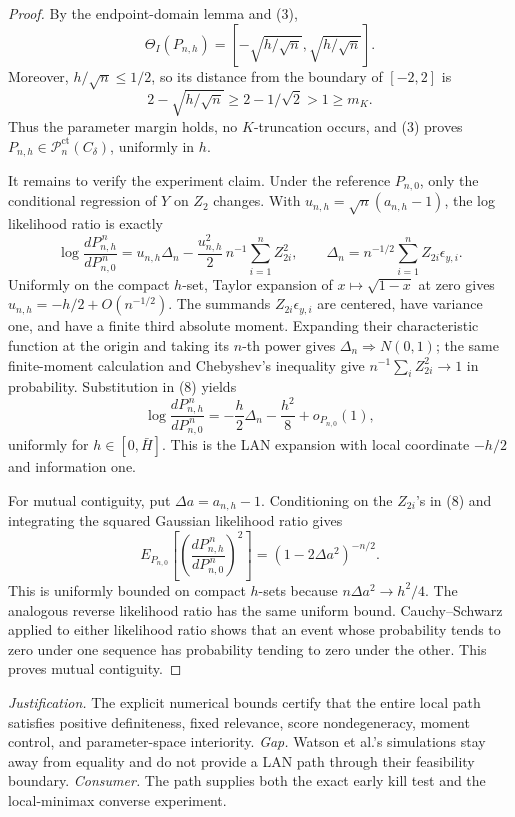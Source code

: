 \documentclass{article}
\begin{document}
\begin{proof}
By the endpoint-domain lemma and (3),
\[
 \Theta_I(P_{n,h})=
 \left[-\sqrt{h/\sqrt n},\sqrt{h/\sqrt n}\right]. \tag{6}
\]
Moreover, \(h/\sqrt n\leq1/2\), so its distance from the boundary of \([-2,2]\) is
\[
 2-\sqrt{h/\sqrt n}\geq2-1/\sqrt2>1\geq m_K. \tag{7}
\]
Thus the parameter margin holds, no \(K\)-truncation occurs, and (3) proves \(P_{n,h}\in\mathcal P_n^{\mathrm{ct}}(C_\delta)\), uniformly in \(h\).

It remains to verify the experiment claim. Under the reference \(P_{n,0}\), only the conditional regression of \(Y\) on \(Z_2\) changes. With \(u_{n,h}=\sqrt n(a_{n,h}-1)\), the log likelihood ratio is exactly
\[
 \log\frac{dP_{n,h}^{\,n}}{dP_{n,0}^{\,n}}
 =u_{n,h}\Delta_n-\frac{u_{n,h}^2}{2}\,
 n^{-1}\sum_{i=1}^nZ_{2i}^2,
 \qquad
 \Delta_n=n^{-1/2}\sum_{i=1}^nZ_{2i}\epsilon_{y,i}. \tag{8}
\]
Uniformly on the compact \(h\)-set, Taylor expansion of \(x\mapsto\sqrt{1-x}\) at zero gives \(u_{n,h}=-h/2+O(n^{-1/2})\). The summands \(Z_{2i}\epsilon_{y,i}\) are centered, have variance one, and have a finite third absolute moment. Expanding their characteristic function at the origin and taking its \(n\)-th power gives \(\Delta_n\Rightarrow N(0,1)\); the same finite-moment calculation and Chebyshev's inequality give \(n^{-1}\sum_i Z_{2i}^2\to1\) in probability. Substitution in (8) yields
\[
 \log\frac{dP_{n,h}^{\,n}}{dP_{n,0}^{\,n}}
 =-\frac h2\Delta_n-\frac{h^2}{8}+o_{P_{n,0}}(1), \tag{9}
\]
uniformly for \(h\in[0,\bar H]\). This is the LAN expansion with local coordinate \(-h/2\) and information one.

For mutual contiguity, put \(\Delta a=a_{n,h}-1\). Conditioning on the \(Z_{2i}\)'s in (8) and integrating the squared Gaussian likelihood ratio gives
\[
 E_{P_{n,0}}\!\left[
 \left(\frac{dP_{n,h}^{\,n}}{dP_{n,0}^{\,n}}\right)^2\right]
 =(1-2\Delta a^2)^{-n/2}. \tag{10}
\]
This is uniformly bounded on compact \(h\)-sets because \(n\Delta a^2\to h^2/4\). The analogous reverse likelihood ratio has the same uniform bound. Cauchy--Schwarz applied to either likelihood ratio shows that an event whose probability tends to zero under one sequence has probability tending to zero under the other. This proves mutual contiguity.
\end{proof}
\par\smallskip\noindent \textit{Justification.} The explicit numerical bounds certify that the entire local path satisfies positive definiteness, fixed relevance, score nondegeneracy, moment control, and parameter-space interiority. \textit{Gap.} Watson et al.'s simulations stay away from equality and do not provide a LAN path through their feasibility boundary. \textit{Consumer.} The path supplies both the exact early kill test and the local-minimax converse experiment.
\end{document}
